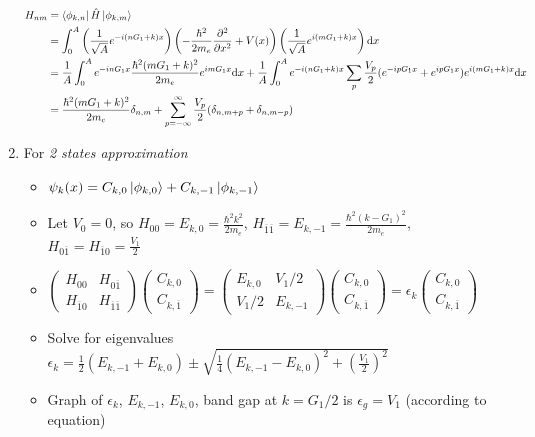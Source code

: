 \documentclass{article}
\theoremstyle{remark}
\theoremstyle{remark}
\begin{document}
\begin{enumerate}
\begin{align*}
            H_{nm} &= \bra{\phi_{k,n}}\hat{H}\ket{\phi_{k,m}}\\
                   &= \int_0^A\left(\frac{1}{\sqrt{A}}e^{-i(nG_1+k)x}\right)\left(-\frac{\hbar^2}{2m_e}\pdv[2]{x}+V(x)\right)\left(\frac{1}{\sqrt{A}}e^{i(mG_1+k)x}\right)\dd x\\
                   &= \frac{1}{A}\int_0^A e^{-inG_1x}\frac{\hbar^2(mG_1+k)^2}{2m_e}e^{imG_1x}\dd x+\frac{1}{A}\int_0^A e^{-i(nG_1+k)x}\sum_{p}\frac{V_p}{2}(e^{-ipG_1x}+e^{ipG_1x})e^{i(mG_1+k)x}\dd x\\
                   &= \frac{\hbar^2(mG_1+k)^2}{2m_e}\delta_{n,m}+\sum_{p=-\infty}^{\infty}\frac{V_p}{2}(\delta_{n,m+p}+\delta_{n,m-p})
        \end{align*}
    \item For \textit{2 states approximation}\begin{itemize}
            \item $\psi_k(x)=C_{k,0}\ket{\phi_{k,0}}+C_{k,-1}\ket{\phi_{k,-1}}$
            \item Let $V_0=0$, so $H_{00}=E_{k,0}=\frac{\hbar^2k^2}{2m_e}$, $H_{\overline{1}\overline{1}}=E_{k,-1}=\frac{\hbar^2(k-G_1)^2}{2m_e}$, $H_{0\overline{1}}=H_{\overline{1}0}=\frac{V_1}{2}$
            \item $\begin{pmatrix}H_{00} & H_{0\overline{1}}\\H_{\overline{1}0} & H_{\overline{1}\overline{1}} \end{pmatrix}\begin{pmatrix}C_{k,0}\\C_{k,\overline{1}}\end{pmatrix}=
                    \begin{pmatrix}E_{k,0} & V_1/2\\V_1/2 & E_{k,-1} \end{pmatrix}\begin{pmatrix}C_{k,0}\\C_{k,\overline{1}}\end{pmatrix}=
                    \epsilon_k \begin{pmatrix}C_{k,0}\\C_{k,\overline{1}}\end{pmatrix}$
            \item Solve for eigenvalues $\epsilon_k=\frac{1}{2}(E_{k,-1}+E_{k,0})\pm\sqrt{\frac{1}{4}(E_{k,-1}-E_{k,0})^2+\left(\frac{V_1}{2}\right)^2}$
            \item Graph of $\epsilon_k$, $E_{k,-1}$, $E_{k,0}$, band gap at $k=G_1/2$ is $\epsilon_g = V_1$ (according to equation)\newline

\end{itemize}
\end{enumerate}
\end{document}
